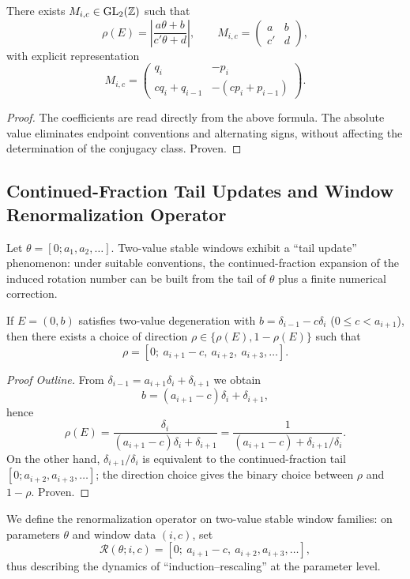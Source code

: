 \begin{theorem}\label{thm:mobius}
There exists $M_{i,c}\in \mathrm{GL}_2(\mathbb{Z})$ such that
\[
\rho(E)=\left|\frac{a\theta+b}{c'\theta+d}\right|,
\qquad
M_{i,c}=\begin{pmatrix}a&b\\c'&d\end{pmatrix},
\]
with explicit representation
\[
M_{i,c}=
\begin{pmatrix}
q_i & -p_i\\
c q_i+q_{i-1} & -(c p_i+p_{i-1})
\end{pmatrix}.
\]
\end{theorem}

\begin{proof}
The coefficients are read directly from the above formula. The absolute value eliminates endpoint conventions and alternating signs, without affecting the determination of the conjugacy class. Proven.
\end{proof}

\subsection{Continued-Fraction Tail Updates and Window Renormalization Operator}

Let $\theta=[0;a_1,a_2,\dots]$. Two-value stable windows exhibit a ``tail update'' phenomenon: under suitable conventions, the continued-fraction expansion of the induced rotation number can be built from the tail of $\theta$ plus a finite numerical correction.

\begin{theorem}\label{thm:tail}
If $E=(0,b)$ satisfies two-value degeneration with $b=\delta_{i-1}-c\delta_i$ ($0\le c<a_{i+1}$), then there exists a choice of direction $\rho\in\{\rho(E),1-\rho(E)\}$ such that
\[
\rho=[0;\ a_{i+1}-c,\ a_{i+2},\ a_{i+3},\dots].
\]
\end{theorem}

\begin{proof}[Proof Outline]
From $\delta_{i-1}=a_{i+1}\delta_i+\delta_{i+1}$ we obtain
\[
b=(a_{i+1}-c)\delta_i+\delta_{i+1},
\]
hence
\[
\rho(E)=\frac{\delta_i}{(a_{i+1}-c)\delta_i+\delta_{i+1}}
=\frac{1}{(a_{i+1}-c)+\delta_{i+1}/\delta_i}.
\]
On the other hand, $\delta_{i+1}/\delta_i$ is equivalent to the continued-fraction tail $[0;a_{i+2},a_{i+3},\dots]$; the direction choice gives the binary choice between $\rho$ and $1-\rho$. Proven.
\end{proof}

We define the renormalization operator on two-value stable window families: on parameters $\theta$ and window data $(i,c)$, set
\[
\mathcal{R}(\theta;i,c)=[0;\ a_{i+1}-c,\ a_{i+2},a_{i+3},\dots],
\]
thus describing the dynamics of ``induction--rescaling'' at the parameter level.
